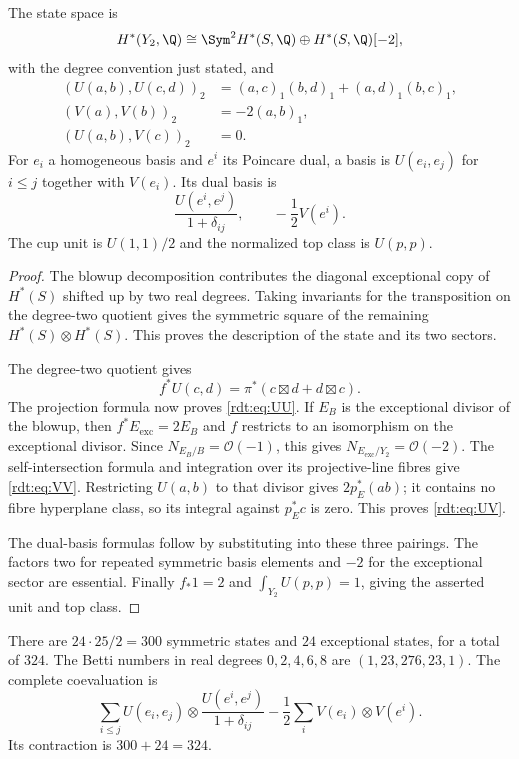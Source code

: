 \begin{proposition}
\label{rdt:prop:Hilb2}
The state space is
\[
 H^*(Y_2,\Q)\cong\Sym^2H^*(S,\Q)\oplus H^*(S,\Q)[-2],
\]
with the degree convention just stated, and
\begin{align}
 (U(a,b),U(c,d))_2&=(a,c)_1(b,d)_1+(a,d)_1(b,c)_1,
 \label{rdt:eq:UU}\\
 (V(a),V(b))_2&=-2(a,b)_1,\label{rdt:eq:VV}\\
 (U(a,b),V(c))_2&=0.\label{rdt:eq:UV}
\end{align}
For $e_i$ a homogeneous basis and $e^i$ its Poincare dual, a basis is
$U(e_i,e_j)$ for $i\le j$ together with $V(e_i)$. Its dual basis is
\[
 \frac{U(e^i,e^j)}{1+\delta_{ij}},\qquad -\frac12V(e^i).
\]
The cup unit is $U(1,1)/2$ and the normalized top class is $U(p,p)$.
\end{proposition}
\begin{proof}
The blowup decomposition contributes the diagonal exceptional copy
of $H^*(S)$ shifted up by two real degrees. Taking invariants for
the transposition on the degree-two quotient gives the symmetric
square of the remaining $H^*(S)\otimes H^*(S)$. This proves the
description of the state and its two sectors.

The degree-two quotient gives
\[
 f^*U(c,d)=\pi^*(c\boxtimes d+d\boxtimes c).
\]
The projection formula now proves \eqref{rdt:eq:UU}. If $E_B$ is
the exceptional divisor of the blowup, then $f^*E_{\mathrm{exc}}=2E_B$
and $f$ restricts to an isomorphism on the exceptional divisor.
Since $N_{E_B/B}=\mathcal O(-1)$, this gives
$N_{E_{\mathrm{exc}}/Y_2}=\mathcal O(-2)$. The self-intersection
formula and integration over its projective-line fibres give
\eqref{rdt:eq:VV}. Restricting $U(a,b)$ to that divisor gives
$2p_E^*(ab)$; it contains no fibre hyperplane class, so its integral
against $p_E^*c$ is zero. This proves \eqref{rdt:eq:UV}.

The dual-basis formulas follow by substituting into these three
pairings. The factors two for repeated symmetric basis elements and
$-2$ for the exceptional sector are essential. Finally $f_*1=2$
and $\int_{Y_2}U(p,p)=1$, giving the asserted unit and top class.
\end{proof}

There are $24\cdot25/2=300$ symmetric states and $24$ exceptional
states, for a total of $324$. The Betti numbers in real degrees
$0,2,4,6,8$ are $(1,23,276,23,1)$. The complete coevaluation is
\[
 \sum_{i\le j}U(e_i,e_j)\otimes
          \frac{U(e^i,e^j)}{1+\delta_{ij}}
   -\frac12\sum_iV(e_i)\otimes V(e^i).
\]
Its contraction is $300+24=324$.

